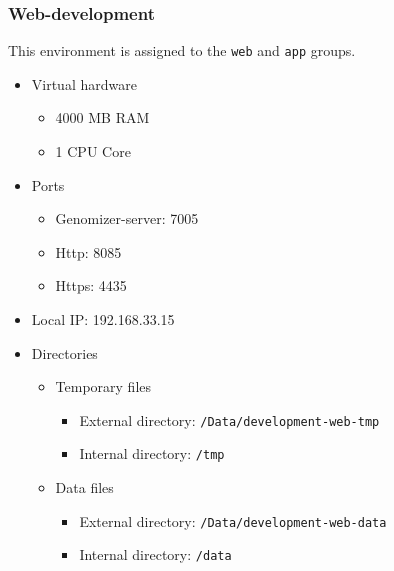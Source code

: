 \subsubsection{Web-development}\label{web-development}

This environment is assigned to the \texttt{web} and \texttt{app}
groups.

\begin{itemize}
\itemsep1pt\parskip0pt
\item
  Virtual hardware

  \begin{itemize}
  \itemsep1pt\parskip0pt
  \item
    4000 MB RAM
  \item
    1 CPU Core
  \end{itemize}
\item
  Ports

  \begin{itemize}
  \itemsep1pt\parskip0pt
  \item
    Genomizer-server: 7005
  \item
    Http: 8085
  \item
    Https: 4435
  \end{itemize}
\item
  Local IP: 192.168.33.15
\item
  Directories

  \begin{itemize}
  \itemsep1pt\parskip0pt
  \item
    Temporary files

    \begin{itemize}
    \itemsep1pt\parskip0pt
    \item
      External directory: \texttt{/Data/development-web-tmp}
    \item
      Internal directory: \texttt{/tmp}
    \end{itemize}
  \item
    Data files

    \begin{itemize}
    \itemsep1pt\parskip0pt
    \item
      External directory: \texttt{/Data/development-web-data}
    \item
      Internal directory: \texttt{/data}
    \end{itemize}
  \end{itemize}
\end{itemize}

